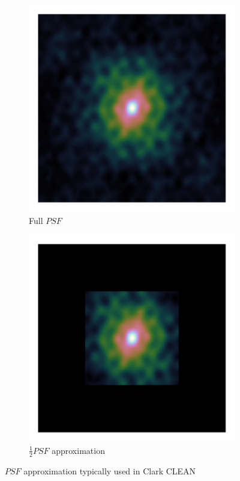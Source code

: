 \begin{figure}[h]
	\centering
	\begin{subfigure}[b]{0.45\linewidth}
		\includegraphics[width=\linewidth, clip, trim= 0.25in 0.25in 0.25in 0.25in]{./chapters/03.cd/simulated/psf.png}
		\caption{Full $PSF$}
	\end{subfigure}
	\begin{subfigure}[b]{0.45\linewidth}
		\includegraphics[width=\linewidth, clip, trim= 0.25in 0.25in 0.25in 0.25in]{./chapters/03.cd/simulated/psfCut.png}
		\caption{$\frac{1}{2}PSF$ approximation}
	\end{subfigure}
	\caption{$PSF$ approximation typically used in Clark CLEAN}
	\label{gradients:clark}
\end{figure}

